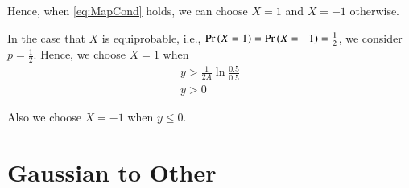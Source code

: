 \documentclass[journal,12pt,twocolumn]{IEEEtran}
\renewcommand\thesection{\arabic{section}}
\begin{document}
\begin{enumerate}[label=\thesection.\arabic*
,ref=\thesection.\theenumi]
	Hence, when \eqref{eq:MapCond} holds, we can choose $X = 1$ and $X = -1$ otherwise.

	In the case that $X$ is equiprobable, i.e., $\Pr\left(X = 1\right) = \Pr\left(X = -1\right) = \frac{1}{2}$, we consider $p = \frac{1}{2}$.
	Hence, we choose $X = 1$ when
	\begin{align}
		y > \frac{1}{2A} \ln{\frac{0.5}{0.5}} \\
		y > 0
	\end{align}

	Also we choose $X = -1$ when $y \leq 0$.

\end{enumerate}

\section{Gaussian to Other}
\end{document}
